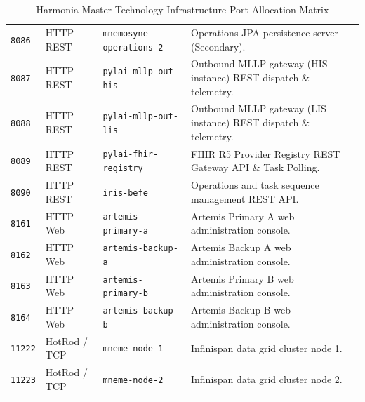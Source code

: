 \begin{table}[htbp]
\begin{tabularx}{\textwidth}{l l l X}
\texttt{8086} & HTTP REST & \texttt{mnemosyne-operations-2} & Operations JPA persistence server (Secondary). \\
\texttt{8087} & HTTP REST & \texttt{pylai-mllp-out-his} & Outbound MLLP gateway (HIS instance) REST dispatch \& telemetry. \\
\texttt{8088} & HTTP REST & \texttt{pylai-mllp-out-lis} & Outbound MLLP gateway (LIS instance) REST dispatch \& telemetry. \\
\texttt{8089} & HTTP REST & \texttt{pylai-fhir-registry} & FHIR R5 Provider Registry REST Gateway API \& Task Polling. \\
\texttt{8090} & HTTP REST & \texttt{iris-befe} & Operations and task sequence management REST API. \\
\texttt{8161} & HTTP Web & \texttt{artemis-primary-a} & Artemis Primary A web administration console. \\
\texttt{8162} & HTTP Web & \texttt{artemis-backup-a} & Artemis Backup A web administration console. \\
\texttt{8163} & HTTP Web & \texttt{artemis-primary-b} & Artemis Primary B web administration console. \\
\texttt{8164} & HTTP Web & \texttt{artemis-backup-b} & Artemis Backup B web administration console. \\
\texttt{11222}& HotRod / TCP & \texttt{mneme-node-1} & Infinispan data grid cluster node 1. \\
\texttt{11223}& HotRod / TCP & \texttt{mneme-node-2} & Infinispan data grid cluster node 2. \\
\bottomrule
\end{tabularx}
\caption{Harmonia Master Technology Infrastructure Port Allocation Matrix}
\label{tab:port_allocation}
\end{table}

\newpage
